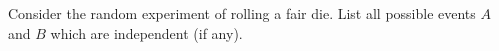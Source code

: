   Consider the random experiment of rolling a fair die.
  List all possible events $A$ and $B$ which are independent (if any).

